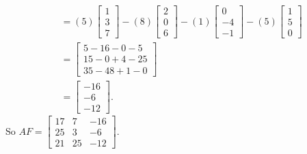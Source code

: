 \begin{example}
\begin{align*}
	&= (5) \left[ \begin{array}{c} 1\\3\\7 \end{array} \right]  - (8)  \left[ \begin{array}{c} 2\\0\\6 \end{array} \right]  - (1)  \left[ \begin{array}{r} 0\\-4\\-1 \end{array} \right] - (5)  \left[ \begin{array}{c} 1\\5\\0 \end{array} \right] \\
	&=  \left[ \begin{array}{c} 5-16-0-5 \\ 15-0+4-25 \\ 35-48+1-0\end{array} \right] \\
	&=  \left[ \begin{array}{r} -16\\-6\\-12 \end{array} \right].
\end{align*}
So $AF = \left[ \begin{array}{ccr} 17&7&-16\\25&3&-6\\21&25&-12 \end{array} \right]$. 


\end{example}
